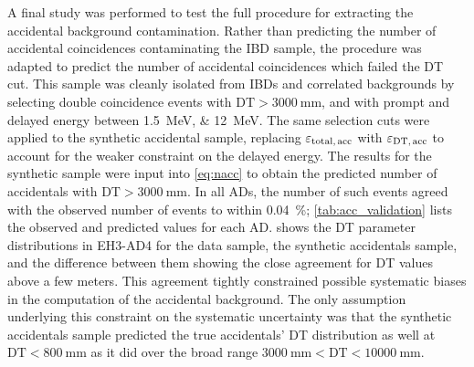 A final study was performed to test the full procedure
for extracting the accidental background contamination.
Rather than predicting the number of accidental coincidences
contaminating the IBD sample,
the procedure was adapted to predict the number of accidental coincidences
which failed the DT cut.
This sample was cleanly isolated from IBDs and correlated backgrounds
by selecting double coincidence events with $\text{DT} > \SI{3000}{\mm}$,
and with prompt and delayed energy between \SIlist{1.5;12}{\MeV}.
The same selection cuts were applied to the synthetic accidental sample,
replacing $\varepsilon_\text{total,\,acc}$ with $\varepsilon_\text{DT,\,acc}$
to account for the weaker constraint on the delayed energy.
The results for the synthetic sample were input into \cref{eq:nacc} to obtain
the predicted number of accidentals with $\text{DT} > \SI{3000}{\mm}$.
In all ADs, the number of such events
agreed with the observed number of events
to within \SI{0.04}{\percent};
\cref{tab:acc_validation} lists the observed and predicted values
for each AD.
 shows the DT parameter distributions in EH3-AD4
for the data sample, the synthetic accidentals sample,
and the difference between them
showing the close agreement for DT values above a few meters.
This agreement tightly constrained possible systematic biases
in the computation of the accidental background.
The only assumption underlying this constraint on the systematic uncertainty
was that the synthetic accidentals sample
predicted the true accidentals' DT distribution as well at $\text{DT} < \SI{800}{\mm}$
as it did over the broad range $\SI{3000}{\mm} < \text{DT} < \SI{10000}{\mm}$.

